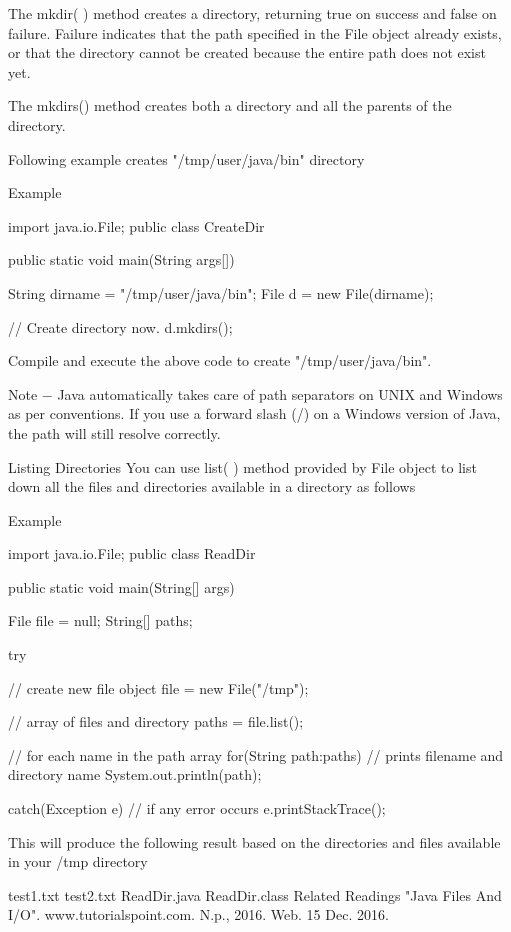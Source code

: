 The mkdir( ) method creates a directory, returning true on success and false on failure. Failure indicates that the path specified in the File object already exists, or that the directory cannot be created because the entire path does not exist yet.

The mkdirs() method creates both a directory and all the parents of the directory.

Following example creates "/tmp/user/java/bin" directory

Example

import java.io.File;
public class CreateDir {

   public static void main(String args[]) {
      String dirname = "/tmp/user/java/bin";
      File d = new File(dirname);

      // Create directory now.
      d.mkdirs();
   }
}
Compile and execute the above code to create "/tmp/user/java/bin".

Note − Java automatically takes care of path separators on UNIX and Windows as per conventions. If you use a forward slash (/) on a Windows version of Java, the path will still resolve correctly.

Listing Directories
You can use list( ) method provided by File object to list down all the files and directories available in a directory as follows

Example

import java.io.File;
public class ReadDir {

   public static void main(String[] args) {
      File file = null;
      String[] paths;

      try {
         // create new file object
         file = new File("/tmp");

         // array of files and directory
         paths = file.list();

         // for each name in the path array
         for(String path:paths) {
            // prints filename and directory name
            System.out.println(path);
         }
      }catch(Exception e) {
         // if any error occurs
         e.printStackTrace();
      }
   }
}
This will produce the following result based on the directories and files available in your /tmp directory

test1.txt
test2.txt
ReadDir.java
ReadDir.class
Related Readings
"Java Files And I/O". www.tutorialspoint.com. N.p., 2016. Web. 15 Dec. 2016.